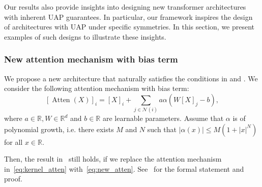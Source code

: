 \documentclass{article}
\newtheorem{proposition}{Proposition}
\newcommand{\cjp}[1]{{\footnotesize\textcolor{orange}{JC: #1}}}
\newcommand{\lt}[1]{{\footnotesize\textcolor{cyan!60!black}{\tt TL: #1}}}
\newcommand{\ql}[1]{{\footnotesize\textcolor{red}{QL: #1}}}
\begin{document}
Our results also provide insights into designing new transformer architectures with inherent UAP guarantees. In particular, our framework inspires the design of architectures with UAP under specific symmetries. In this section, we present examples of such designs to illustrate these insights.

\subsubsection{New attention mechanism with bias term}

We propose a new architecture that naturally satisfies the conditions in  and . We consider the following attention mechanism with bias term:
\begin{equation}
    \label{eq:new_atten}
    [\operatorname{Atten}(X)]_i=[X]_i+\sum_{j\in\mathcal N(i)} a \alpha(W[X]_j-b),
\end{equation}
where $a\in \mathbb R, W\in\mathbb R^d$ and $b\in\mathbb R$ are learnable parameters.
Assume that $\alpha$ is of polynomial growth, i.e. there exists $M$ and $N$ such that $|\alpha(x)|\le M(1+|x|^N)$ for all $x\in\mathbb R$.

Then, the result in~ still holds, if we replace the attention mechanism in~\eqref{eq:kernel_atten} with~\eqref{eq:new_atten}. See~ for the formal statement and proof.


\end{document}
